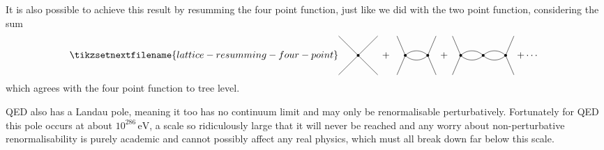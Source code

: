 \documentclass[fleqn]{NotesClass}
\begin{document}
    It is also possible to achieve this result by resumming the four point function, just like we did with the two point function, considering the sum
    \begin{equation}
        \tikzsetnextfilename{lattice-resumming-four-point}
        \begin{tikzpicture}[baseline=(plus.base)]
            \draw[xshift=2cm] (45:1) -- (225:1);
            \draw[xshift=2cm] (135:1) -- (315:1);
            \fill (2, 0) circle [radius=0.05];
            \node (plus) at (3, 0) {\(+\)};
            \begin{scope}[xshift=-0.3cm]
                \draw[xshift=4cm] (-0.3, 0.707) -- (0, 0);
                \draw[xshift=4cm] (-0.3, -0.707) -- (0, 0);
                \draw[xshift=4.81cm] (0.3, 0.707) -- (0, 0);
                \draw[xshift=4.81cm] (0.3, -0.707) -- (0, 0);
                \fill (4, 0) circle [radius=0.05];
                \fill (4.81, 0) circle [radius=0.05];
                \draw (4, 0) to [out=45, in=135] (4.81, 0);
                \draw (4, 0) to [out=-45, in=-135] (4.81, 0);
            \end{scope}
            \node at (5.1, 0) {\(+\)};
            \begin{scope}[xshift=1.7cm]
                \draw[xshift=4cm] (-0.3, 0.707) -- (0, 0);
                \draw[xshift=4cm] (-0.3, -0.707) -- (0, 0);
                \draw[xshift=5.62cm] (0.3, 0.707) -- (0, 0);
                \draw[xshift=5.62cm] (0.3, -0.707) -- (0, 0);
                \fill (4, 0) circle [radius=0.05];
                \fill (4.81, 0) circle [radius=0.05];
                \fill (5.62, 0) circle [radius=0.05];
                \draw (4, 0) to [out=45, in=135] (4.81, 0);
                \draw (4, 0) to [out=-45, in=-135] (4.81, 0);
                \draw (4.81, 0) to [out=45, in=135] (5.62, 0);
                \draw (4.81, 0) to [out=-45, in=-135] (5.62, 0);
            \end{scope}
            \node at (8.1, 0) {\(+ \dotsb\)};
        \end{tikzpicture}
    \end{equation}
    which agrees with the four point function to tree level.
    
    QED also has a Landau pole, meaning it too has no continuum limit and may only be renormalisable perturbatively.
    Fortunately for QED this pole occurs at about \(10^{286}\, \unit{\electronvolt}\), a scale so ridiculously large that it will never be reached and any worry about non-perturbative renormalisability is purely academic and cannot possibly affect any real physics, which must all break down far below this scale.
    
\end{document}
